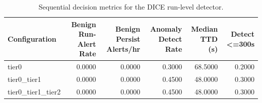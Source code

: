 \begin{table}[t]
\centering
\caption{Sequential decision metrics for the DICE run-level detector.}
\label{tab:dice_sequential_metrics}
\footnotesize
\begin{tabular}{lrrrrr}
\toprule
Configuration & Benign Run-Alert Rate & Benign Persist Alerts/hr & Anomaly Detect Rate & Median TTD (s) & Detect <=300s \\
\midrule
tier0 & 0.0000 & 0.0000 & 0.3000 & 68.5000 & 0.2000 \\
tier0_tier1 & 0.0000 & 0.0000 & 0.4500 & 48.0000 & 0.3000 \\
tier0_tier1_tier2 & 0.0000 & 0.0000 & 0.4500 & 48.0000 & 0.3000 \\
\bottomrule
\end{tabular}

\end{table}
